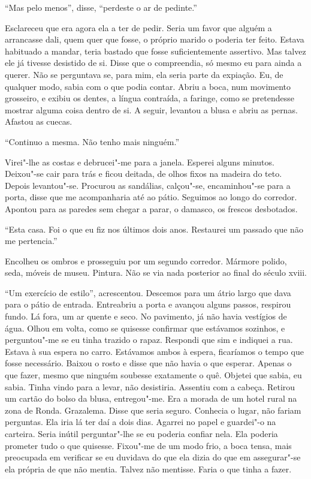 ``Mas pelo menos'',
disse,
``perdeste o ar de pedinte.''

Esclareceu que era agora ela a ter de pedir. Seria um favor que alguém a
arrancasse dali, quem quer que fosse, o próprio marido o poderia ter
feito. Estava habituado a mandar, teria bastado que fosse
suficientemente assertivo. Mas talvez ele já tivesse desistido de si.
Disse que o compreendia, só mesmo eu para ainda a querer. Não se
perguntava se, para mim, ela seria parte da expiação. Eu, de qualquer
modo, sabia com o que podia contar. Abriu a boca, num movimento
grosseiro, e exibiu os dentes, a língua contraída, a faringe, como se
pretendesse mostrar alguma coisa dentro de si. A seguir, levantou a
blusa e abriu as pernas. Afastou as cuecas.

``Continuo a mesma. Não tenho mais ninguém.''

Virei"-lhe as costas e debrucei"-me para a janela. Esperei alguns
minutos. Deixou"-se cair para trás e ficou deitada, de olhos fixos na
madeira do teto. Depois levantou"-se. Procurou as sandálias,
calçou"-se, encaminhou"-se para a porta, disse que me acompanharia até
ao pátio. Seguimos ao longo do corredor. Apontou para as paredes sem
chegar a parar, o damasco, os frescos desbotados.

``Esta casa. Foi o que eu fiz nos últimos dois anos. Restaurei um passado
que não me pertencia.''

Encolheu os ombros e prosseguiu por um segundo corredor. Mármore polido,
seda, móveis de museu. Pintura. Não se via nada posterior ao final do
século xviii.

``Um exercício de estilo'',
acrescentou. Descemos para um átrio largo que dava para o pátio de
entrada. Entreabriu a porta e avançou alguns passos, respirou fundo. Lá
fora, um ar quente e seco. No pavimento, já não havia vestígios de água.
Olhou em volta, como se quisesse confirmar que estávamos sozinhos, e
perguntou"-me se eu tinha trazido o rapaz. Respondi que sim e indiquei a
rua. Estava à sua espera no carro. Estávamos ambos à espera, ficaríamos
o tempo que fosse necessário. Baixou o rosto e disse que não havia o que
esperar. Apenas o que fazer, mesmo que ninguém soubesse exatamente o
quê. Objetei que sabia, eu sabia. Tinha vindo para a levar, não
desistiria. Assentiu com a cabeça. Retirou um cartão do bolso da blusa,
entregou"-me. Era a morada de um hotel rural na zona de Ronda.
Grazalema. Disse que seria seguro. Conhecia o lugar, não fariam
perguntas. Ela iria lá ter daí a dois dias. Agarrei no papel e
guardei"-o na carteira. Seria inútil perguntar"-lhe se eu poderia
confiar nela. Ela poderia prometer tudo o que quisesse. Fixou"-me de um
modo frio, a boca tensa, mais preocupada em verificar se eu duvidava do
que ela dizia do que em assegurar"-se ela própria de que não mentia.
Talvez não mentisse. Faria o que tinha a fazer.


